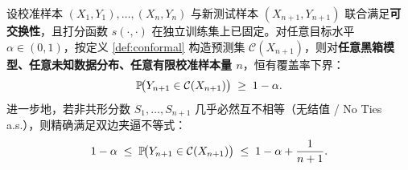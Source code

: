 \begin{thmBox}
\begin{theorem}[分裂共形预测的有限样本分布无关覆盖定理]\label{thm:conformal-coverage}
设校准样本 $(X_1, Y_1), \dots, (X_n, Y_n)$ 与新测试样本 $(X_{n+1}, Y_{n+1})$ 联合满足\textbf{可交换性}，且打分函数 $s(\cdot,\cdot)$ 在独立训练集上已固定。对任意目标水平 $\alpha \in (0,1)$，按定义 \ref{def:conformal} 构造预测集 $\mathcal{C}(X_{n+1})$，则对\textbf{任意黑箱模型、任意未知数据分布、任意有限校准样本量 $n$}，恒有覆盖率下界：
\begin{equation}\label{eq:conformal-lower}
  \mathbb{P}\!\big(Y_{n+1} \in \mathcal{C}(X_{n+1})\big) \;\ge\; 1 - \alpha.
\end{equation}
进一步地，若非共形分数 $S_1,\dots,S_{n+1}$ 几乎必然互不相等（无结值 / No Ties a.s.），则精确满足双边夹逼不等式：
\begin{equation}\label{eq:conformal-sandwich}
  1 - \alpha \;\le\; \mathbb{P}\!\big(Y_{n+1} \in \mathcal{C}(X_{n+1})\big) \;\le\; 1 - \alpha + \frac{1}{n+1}.
\end{equation}
\end{theorem}
\end{thmBox}

